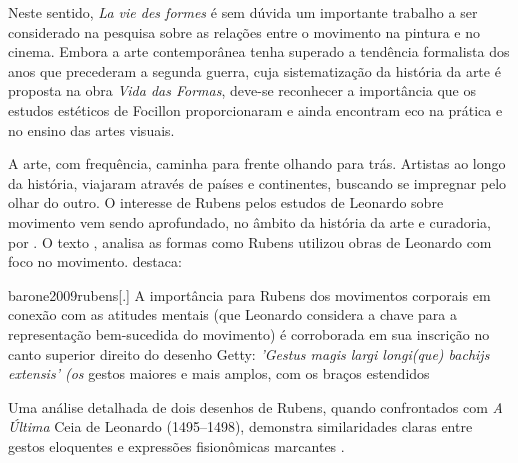 Neste sentido, \emph{La vie des formes} é sem dúvida um importante
trabalho a ser considerado na pesquisa sobre as relações entre o
movimento na pintura e no cinema. Embora a arte contemporânea tenha
superado a tendência formalista dos anos que precederam a segunda
guerra, cuja sistematização da história da arte é proposta na obra
\emph{Vida das Formas}, deve-se reconhecer a importância que os estudos
estéticos de Focillon proporcionaram e ainda encontram eco na prática e
no ensino das artes visuais.

A arte, com frequência, caminha para frente olhando para trás. Artistas
ao longo da história, viajaram através de países e continentes,
buscando se impregnar pelo olhar do outro. O interesse de Rubens pelos
estudos de Leonardo sobre movimento vem sendo aprofundado, no âmbito da
história da arte e curadoria, por
\textcite{barone2009rubens}. O texto
\emph{}, analisa as formas como Rubens
utilizou obras de Leonardo com foco no movimento.
\textcite{barone2009rubens} destaca:

\begin{displaycquote}[445]{barone2009rubens}[.]
	A importância para Rubens dos movimentos corporais em conexão com as
	atitudes mentais (que Leonardo considera a chave para a representação
	bem-sucedida do movimento) é corroborada em sua inscrição no canto
	superior direito do desenho Getty: \emph{'Gestus magis largi longi(que)
		bachijs extensis' (os} gestos  maiores e mais amplos, com os
	braços estendidos
\end{displaycquote}

Uma análise detalhada de dois desenhos de Rubens, quando confrontados
com \emph{A Última} Ceia de Leonardo (1495--1498), demonstra
similaridades claras entre gestos eloquentes e expressões fisionômicas
marcantes \parencite[443-444]{barone2009rubens}.


